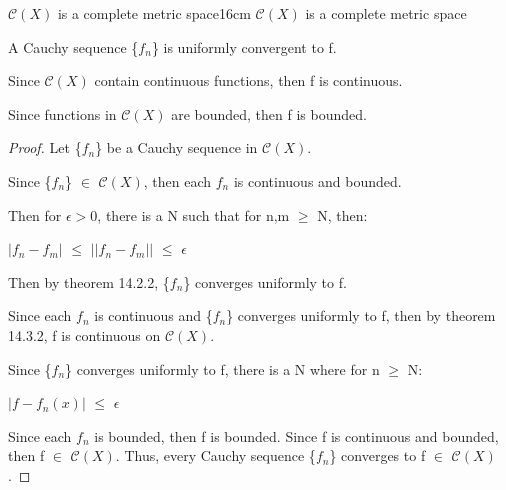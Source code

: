     \vspace{0.5cm}



    \begin{wtheorem}{$\mathscr{C}(X)$ is a complete metric space}{16cm}
        $\mathscr{C}(X)$ is a complete metric space        
    \end{wtheorem}

    \begin{intuition}
        A Cauchy sequence \{$f_n$\} is uniformly convergent to f.

        Since $\mathscr{C}(X)$ contain continuous functions, then f is continuous.
        
        Since functions in $\mathscr{C}(X)$ are bounded, then f is bounded.
    \end{intuition}

    \vspace{0.1cm}

    \begin{proof}
        Let \{$f_n$\} be a Cauchy sequence in $\mathscr{C}(X)$.

        Since \{$f_n$\} $\in$ $\mathscr{C}(X)$, then each
        $f_n$ is continuous and bounded.

        Then for $\epsilon > 0$, there is a N such that for n,m $\geq$ N, then:

        \hspace{0.5cm}
        $|f_n - f_m|$
        $\leq$ $||f_n - f_m||$
        $\leq$ $\epsilon$

        Then by {\color{red} theorem 14.2.2}, \{$f_n$\} converges uniformly to f.

        Since each $f_n$ is continuous and \{$f_n$\} converges uniformly to f,
        then by {\color{red} theorem 14.3.2}, f is continuous on $\mathscr{C}(X)$.

        Since \{$f_n$\} converges uniformly to f, there is a N where for n $\geq$ N: 

        \hspace{0.5cm}
        $|f - f_n(x)|$ $\leq$ $\epsilon$
        
        Since each $f_n$ is bounded, then f is bounded.
        Since f is continuous and bounded, then f $\in$ $\mathscr{C}(X)$.
        Thus, every Cauchy sequence \{$f_n$\} converges to f $\in$ $\mathscr{C}(X)$.
    \end{proof}

    \newpage





